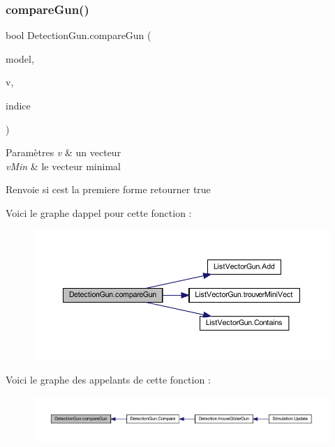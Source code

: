 \subsubsection{\texorpdfstring{compare\+Gun()}{compareGun()}}
{\footnotesize\ttfamily bool Detection\+Gun.\+compare\+Gun (\begin{DoxyParamCaption}\item[{List$<$ \mbox{\hyperlink{class_list_vector_gun}{List\+Vector\+Gun}} $>$}]{model,  }\item[{\mbox{\hyperlink{class_list_vector_gun}{List\+Vector\+Gun}}}]{v,  }\item[{int}]{indice }\end{DoxyParamCaption})\hspace{0.3cm}{\ttfamily [inline]}}






\begin{DoxyParams}{Paramètres}
{\em v} & un vecteur \\
\hline
{\em v\+Min} & le vecteur minimal \\
\hline
\end{DoxyParams}
\begin{DoxyReturn}{Renvoie}
si c\textquotesingle{}est la premiere forme retourner true 
\end{DoxyReturn}
Voici le graphe d\textquotesingle{}appel pour cette fonction \+:
\nopagebreak
\begin{figure}[H]
\begin{center}
\leavevmode
\includegraphics[width=350pt]{class_detection_gun_a0ca849e6a37b8734261999c4f8f64523_cgraph}
\end{center}
\end{figure}
Voici le graphe des appelants de cette fonction \+:
\nopagebreak
\begin{figure}[H]
\begin{center}
\leavevmode
\includegraphics[width=350pt]{class_detection_gun_a0ca849e6a37b8734261999c4f8f64523_icgraph}
\end{center}
\end{figure}
\mbox{\label{class_detection_gun_af0283c67f8fe041c2ff8ded541054d56}} 

